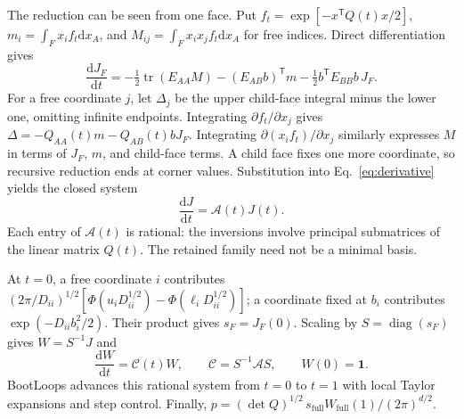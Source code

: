 \documentclass[aps,pra,onecolumn,11pt,tightenlines,notitlepage,nofootinbib]{revtex4-2}
\newcommand{\dd}{\mathrm{d}}
\newcommand{\one}{\mathbf{1}}
\begin{document}
The reduction can be seen from one face. Put
$f_t=\exp[-x^{\mathsf T}Q(t)x/2]$,
$m_i=\int_F x_i f_t\dd x_A$, and
$M_{ij}=\int_F x_ix_j f_t\dd x_A$ for free indices. Direct differentiation
gives
\begin{equation}
 \frac{\dd J_F}{\dd t}=-\tfrac12\operatorname{tr}(E_{AA}M)
       -(E_{AB}b)^{\mathsf T}m
       -\tfrac12 b^{\mathsf T}E_{BB}b\,J_F .
 \label{eq:derivative}
\end{equation}
For a free coordinate $j$, let $\Delta_j$ be the upper child-face integral
minus the lower one, omitting infinite endpoints. Integrating
$\partial f_t/\partial x_j$ gives
$\Delta=-Q_{AA}(t)m-Q_{AB}(t)bJ_F$.
Integrating $\partial(x_i f_t)/\partial x_j$ similarly expresses $M$ in
terms of $J_F$, $m$, and child-face terms. A child face fixes one more
coordinate, so recursive reduction ends at corner values. Substitution
into Eq.~\eqref{eq:derivative} yields the closed system
\begin{equation}
 \frac{\dd J}{\dd t}=\mathcal A(t)J(t).
 \label{eq:system}
\end{equation}
Each entry of $\mathcal A(t)$ is rational: the inversions involve principal
submatrices of the linear matrix $Q(t)$. The retained family need not be a
minimal basis.

At $t=0$, a free coordinate $i$ contributes
$(2\pi/D_{ii})^{1/2}[\Phi(u_iD_{ii}^{1/2})-\Phi(\ell_iD_{ii}^{1/2})]$;
a coordinate fixed at $b_i$ contributes $\exp(-D_{ii}b_i^2/2)$.
Their product gives $s_F=J_F(0)$. Scaling by
$S=\operatorname{diag}(s_F)$ gives $W=S^{-1}J$ and
\begin{equation}
 \frac{\dd W}{\dd t}=\mathcal C(t)W,\qquad
 \mathcal C=S^{-1}\mathcal A S,\qquad W(0)=\one .
 \label{eq:scaled}
\end{equation}
BootLoops advances this rational system from $t=0$ to $t=1$ with local
Taylor expansions and step control. Finally,
$p=(\det Q)^{1/2}\,s_{\mathrm{full}}W_{\mathrm{full}}(1)/(2\pi)^{d/2}$.
\end{document}
